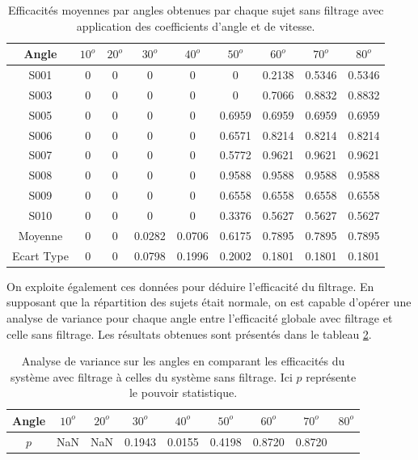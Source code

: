 \documentclass[letterpaper, twoside, 12pt, memoire, creativecommons, hyperref]{thETS}
\begin{document}
\begin{table}[ht]
	\caption{Efficacités moyennes par angles obtenues par chaque sujet sans filtrage avec application des coefficients d'angle et de vitesse. }
		\begin{tabular}{|c|c|c|c|c|c|c|c|c|}
		\hline
			Angle & $10^{o}$ & $20^{o}$ & $30^{o}$ & $40^{o}$ & $50^{o}$ & $60^{o}$ & $70^{o}$ & $80^{o}$\\
	    \hline
	    		S001 &  0 &  0 &  0 &  0 &  0 & 0.2138 & 0.5346 & 0.5346\\
	    \hline
	    		S003 &  0 &  0 &  0 &  0 &  0 & 0.7066 & 0.8832 & 0.8832\\
	    \hline
	    		S005 &  0 &  0 &  0 &  0 & 0.6959 & 0.6959 & 0.6959 & 0.6959\\
	    \hline
	    		S006 &  0 &  0 &  0 &  0 & 0.6571 & 0.8214 & 0.8214 & 0.8214\\
	    \hline
	    		S007 &  0 &  0 &  0 &  0 & 0.5772 & 0.9621 & 0.9621 & 0.9621\\
	    \hline
	    		S008 &  0 &  0 &  0 &  0 & 0.9588 & 0.9588 & 0.9588 & 0.9588\\
	    \hline
	    		S009 &  0 &  0 &  0 &  0 & 0.6558 & 0.6558 & 0.6558 & 0.6558\\
	    \hline
	    		S010 &  0 &  0 &  0 &  0 & 0.3376 & 0.5627 & 0.5627 & 0.5627\\
	    \hline
	    		Moyenne & 0 & 0 & 0.0282 & 0.0706 & 0.6175 & 0.7895 & 0.7895 & 0.7895\\
	    \hline
	    		Ecart Type & 0 & 0 & 0.0798 & 0.1996 & 0.2002 & 0.1801 & 0.1801 & 0.1801\\
	    \hline
		\end{tabular}
	\label{tab:effFanglecoeff}
\end{table}

On exploite également ces données pour déduire l'efficacité du filtrage. En supposant que la répartition des sujets était normale, on est capable d'opérer une analyse de variance pour chaque angle entre l'efficacité globale avec filtrage et celle sans filtrage. Les résultats obtenues sont présentés dans le tableau \ref{tab:anova}. 

\begin{table}[ht]
	\caption{Analyse de variance sur les angles en comparant les efficacités du système avec filtrage à celles du système sans filtrage. Ici $p$ représente le pouvoir statistique.}
		\begin{tabular}{|c|c|c|c|c|c|c|c|c|}
		\hline
			Angle & $10^{o}$ & $20^{o}$ & $30^{o}$ & $40^{o}$ & $50^{o}$ & $60^{o}$ & $70^{o}$ & $80^{o}$\\
	    \hline
	    		$p$ &  NaN & NaN & 0.1943 & 0.0155 & 0.4198 & 0.8720 & 0.8720\\
	    \hline
		\end{tabular}
	\label{tab:anova}
\end{table}
\end{document}
